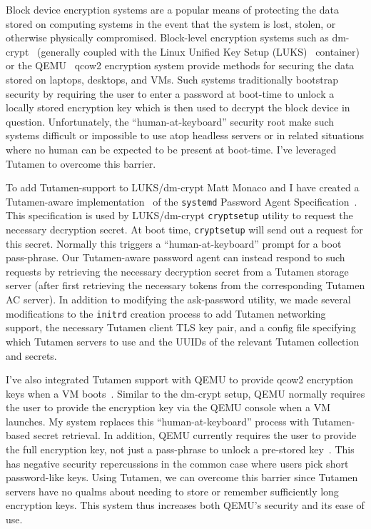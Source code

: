 Block device encryption systems are a popular means of protecting the
data stored on computing systems in the event that the system is lost,
stolen, or otherwise physically compromised.  Block-level encryption
systems such as dm-crypt~\cite{dm-crypt} (generally coupled with the
Linux Unified Key Setup (LUKS)~\cite{luks} container) or the
QEMU~\cite{qemu} qcow2 encryption system provide methods for securing
the data stored on laptops, desktops, and VMs. Such systems
traditionally bootstrap security by requiring the user to enter a
password at boot-time to unlock a locally stored encryption key which
is then used to decrypt the block device in question. Unfortunately,
the ``human-at-keyboard'' security root make such systems difficult or
impossible to use atop headless servers or in related situations where
no human can be expected to be present at boot-time. I've leveraged
Tutamen to overcome this barrier.

To add Tutamen-support to LUKS/dm-crypt Matt Monaco and I have created
a Tutamen-aware implementation~\cite{src-tutamen-askpassword} of the
\texttt{systemd} Password Agent
Specification~\cite{systemd-passwordagents}. This specification is
used by LUKS/dm-crypt \texttt{cryptsetup} utility to request the
necessary decryption secret. At boot time, \texttt{cryptsetup} will
send out a request for this secret. Normally this triggers a
``human-at-keyboard'' prompt for a boot pass-phrase. Our Tutamen-aware
password agent can instead respond to such requests by retrieving the
necessary decryption secret from a Tutamen storage server (after first
retrieving the necessary tokens from the corresponding Tutamen AC
server). In addition to modifying the ask-password utility, we made
several modifications to the \texttt{initrd} creation process to add
Tutamen networking support, the necessary Tutamen client TLS key pair,
and a config file specifying which Tutamen servers to use and the
UUIDs of the relevant Tutamen collection and secrets.

I've also integrated Tutamen support with QEMU to provide qcow2
encryption keys when a VM boots~\cite{src-qemu-tutamen}. Similar to
the dm-crypt setup, QEMU normally requires the user to provide the
encryption key via the QEMU console when a VM launches. My system
replaces this ``human-at-keyboard'' process with Tutamen-based secret
retrieval. In addition, QEMU currently requires the user to provide
the full encryption key, not just a pass-phrase to unlock a pre-stored
key~\cite{berrange-qemucrypto}. This has negative security
repercussions in the common case where users pick short password-like
keys. Using Tutamen, we can overcome this barrier since Tutamen
servers have no qualms about needing to store or remember sufficiently
long encryption keys. This system thus increases both QEMU's security
and its ease of use.

